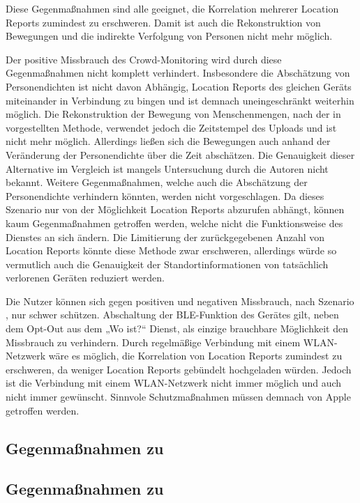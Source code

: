 Diese Gegenmaßnahmen sind alle geeignet, die Korrelation mehrerer Location Reports zumindest zu erschweren.
Damit ist auch die Rekonstruktion von Bewegungen und die indirekte Verfolgung von Personen nicht mehr möglich. 

Der positive Missbrauch des Crowd-Monitoring wird durch diese Gegenmaßnahmen nicht komplett verhindert.
Insbesondere die Abschätzung von Personendichten ist nicht davon Abhängig, Location Reports des gleichen Geräts miteinander in Verbindung zu bingen und ist demnach uneingeschränkt weiterhin möglich.
Die Rekonstruktion der Bewegung von Menschenmengen, nach der in \cite{Tonetto_FindMy} vorgestellten Methode, verwendet jedoch die Zeitstempel des Uploads und ist nicht mehr möglich.
Allerdings ließen sich die Bewegungen auch anhand der Veränderung der Personendichte über die Zeit abschätzen.
Die Genauigkeit dieser Alternative im Vergleich ist mangels Untersuchung durch die Autoren nicht bekannt.
Weitere Gegenmaßnahmen, welche auch die Abschätzung der Personendichte verhindern könnten, werden nicht vorgeschlagen.
Da dieses Szenario nur von der Möglichkeit Location Reports abzurufen abhängt, können kaum Gegenmaßnahmen getroffen werden, welche nicht die Funktionsweise des Dienstes an sich ändern.
Die Limitierung der zurückgegebenen Anzahl von Location Reports könnte diese Methode zwar erschweren, allerdings würde so vermutlich auch die Genauigkeit der Standortinformationen von tatsächlich verlorenen Geräten reduziert werden.

Die Nutzer können sich gegen positiven und negativen Missbrauch, nach Szenario , nur schwer schützen.
Abschaltung der \ac{BLE}-Funktion des Gerätes gilt, neben dem Opt-Out aus dem „Wo ist?“ Dienst, als einzige brauchbare Möglichkeit den Missbrauch zu verhindern.
Durch regelmäßige Verbindung mit einem WLAN-Netzwerk wäre es möglich, die Korrelation von Location Reports zumindest zu erschweren, da weniger Location Reports gebündelt hochgeladen würden. 
Jedoch ist die Verbindung mit einem WLAN-Netzwerk nicht immer möglich und auch nicht immer gewünscht.
Sinnvole Schutzmaßnahmen müssen demnach von Apple getroffen werden.


\subsection{Gegenmaßnahmen zu }

\subsection{Gegenmaßnahmen zu }


